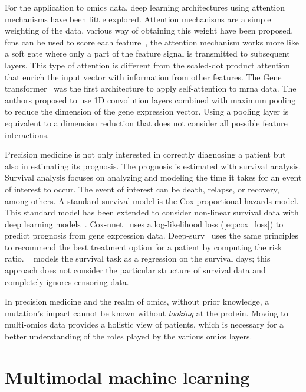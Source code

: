 \documentclass[../main.tex]{subfiles}
\begin{document}
	For the application to omics data, deep learning architectures using attention mechanisms have been little explored.
	Attention mechanisms are a simple weighting of the data, various way of obtaining this weight have been proposed.
	\Glspl{fcn} can be used to score each feature~\cite{Lee2022,beykikhoshkDeepTRIAGEInterpretableIndividualised2020a}, the attention mechanism works more like a soft gate where only a part of the feature signal is transmitted to subsequent layers.
	This type of attention is different from the scaled-dot product attention that enrich the input vector with information from other features.
	The Gene transformer~\cite{Khan2023} was the first architecture to apply self-attention to \gls{mrna} data.
	The authors proposed to use 1D convolution layers combined with maximum pooling to reduce the dimension of the gene expression vector.
	Using a pooling layer is equivalent to a dimension reduction that does not consider all possible feature interactions.

	Precision medicine is not only interested in correctly diagnosing a patient but also in estimating its prognosis.
	The prognosis is estimated with survival analysis.
	Survival analysis focuses on analyzing and modeling the time it takes for an event of interest to occur.
	The event of interest can be death, relapse, or recovery, among others.
	A standard survival model is the Cox proportional hazards model.
	This standard model has been extended to consider non-linear survival data with deep learning models~\cite{katzmanDeepSurvPersonalizedTreatment2018,Ching2018}.
	Cox-nnet~\cite{Ching2018} uses a log-likelihood loss (\cref{eq:cox_loss}) to predict prognosis from gene expression data.
	Deep-surv~\cite{katzmanDeepSurvPersonalizedTreatment2018} uses the same principles to recommend the best treatment option for a patient by computing the risk ratio.
	\citeauthor{Lee2022}~\cite{Lee2022} models the survival task as a regression on the survival days; this approach does not consider the particular structure of survival data and completely ignores censoring data.

	In precision medicine and the realm of omics, without prior knowledge, a mutation's impact cannot be known without \emph{looking} at the protein.
	Moving to multi-omics data provides a holistic view of patients, which is necessary for a better understanding of the roles played by the various omics layers.

\section{Multimodal machine learning}
\end{document}
